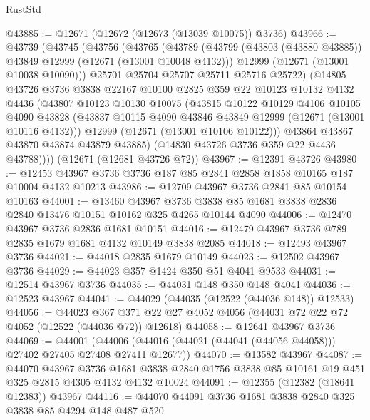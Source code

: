 \begin{lexlean}{RustStd}
\begin{coremodule}
@43885 := @12671 (@12672 (@12673 (@13039 @10075)) @3736)
@43966 := @43739
    (@43745
      (@43756
        (@43765
          (@43789
            (@43799 (@43803 (@43880 @43885)) @43849 @12999 (@12671 (@13001 @10048 @4132)))
            @12999
            (@12671 (@13001 @10038 @10090)))
          @25701
          @25704
          @25707
          @25711
          @25716
          @25722)
        (@14805
          @43726
          @3736
          @3838
          @22167
          @10100
          @2825
          @359
          @22
          @10123
          @10132
          @4132
          @4436
          (@43807
            @10123
            @10130
            @10075
            (@43815
              @10122
              @10129
              @4106
              @10105
              @4090
              @43828
              (@43837 @10115 @4090 @43846 @43849 @12999 (@12671 (@13001 @10116 @4132)))
              @12999
              (@12671 (@13001 @10106 @10122)))
            @43864
            @43867
            @43870
            @43874
            @43879
            @43885)
          (@14830 @43726 @3736 @359 @22 @4436 @43788))))
    (@12671 (@12681 @43726 @72))
@43967 := @12391 @43726
@43980 := @12453 @43967 @3736 @3736 @187 @85 @2841 @2858 @1858 @10165 @187 @10004 @4132 @10213
@43986 := @12709 @43967 @3736 @2841 @85 @10154 @10163
@44001 := @13460
    @43967
    @3736
    @3838
    @85
    @1681
    @3838
    @2836
    @2840
    @13476
    @10151
    @10162
    @325
    @4265
    @10144
    @4090
@44006 := @12470 @43967 @3736 @2836 @1681 @10151
@44016 := @12479 @43967 @3736 @789 @2835 @1679 @1681 @4132 @10149 @3838 @2085
@44018 := @12493 @43967 @3736
@44021 := @44018 @2835 @1679 @10149
@44023 := @12502 @43967 @3736
@44029 := @44023 @357 @1424 @350 @51 @4041 @9533
@44031 := @12514 @43967 @3736
@44035 := @44031 @148 @350 @148 @4041
@44036 := @12523 @43967
@44041 := @44029 (@44035 (@12522 (@44036 @148)) @12533)
@44056 := @44023
    @367
    @371
    @22
    @27
    @4052
    @4056
    (@44031 @72 @22 @72 @4052 (@12522 (@44036 @72)) @12618)
@44058 := @12641 @43967 @3736
@44069 := @44001
    (@44006 (@44016 (@44021 (@44041 (@44056 @44058))) @27402 @27405 @27408 @27411 @12677))
@44070 := @13582 @43967
@44087 := @44070
    @43967
    @3736
    @1681
    @3838
    @2840
    @1756
    @3838
    @85
    @10161
    @19
    @451
    @325
    @2815
    @4305
    @4132
    @4132
    @10024
@44091 := @12355 (@12382 (@18641 @12383)) @43967
@44116 := @44070
    @44091
    @3736
    @1681
    @3838
    @2840
    @325
    @3838
    @85
    @4294
    @148
    @487
    @520

\end{coremodule}
\end{lexlean}
